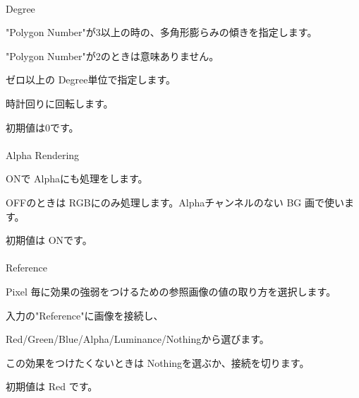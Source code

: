 \documentclass[a4paper,12pt]{article}
\begin{document}
\newpage

\thispagestyle{empty}

\ \vspace{-0.2em}
\\
\par
\noindent Degree\par
"Polygon Number"が3以上の時の、多角形膨らみの傾きを指定します。\par
"Polygon Number"が2のときは意味ありません。\par
ゼロ以上の Degree単位で指定します。\par
時計回りに回転します。\par
初期値は0です。\\
\\
Alpha Rendering\par
ONで Alphaにも処理をします。\par
OFFのときは RGBにのみ処理します。Alphaチャンネルのない BG 画で使います。\par
初期値は ONです。\\
\\
Reference\par
Pixel 毎に効果の強弱をつけるための参照画像の値の取り方を選択します。\par
入力の"Reference"に画像を接続し、\par
Red/Green/Blue/Alpha/Luminance/Nothingから選びます。\par
この効果をつけたくないときは Nothingを選ぶか、接続を切ります。\par
初期値は Red です。
\end{document}
